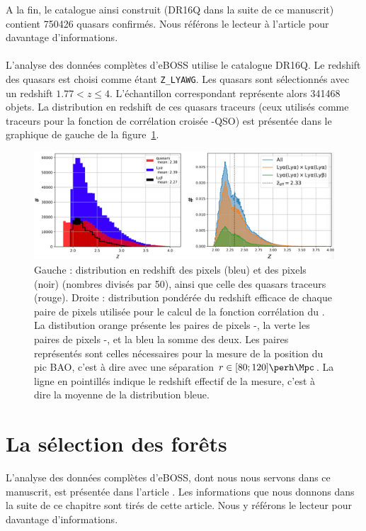 \documentclass[11pt, twoside, a4paper, openright]{report}
\begin{document}
A la fin, le catalogue ainsi construit (DR16Q dans la suite de ce manuscrit) contient \num{750426} quasars confirmés. Nous référons le lecteur à l'article \citet{CITE:Lyke in prep} pour davantage d'informations.



\paragraph{}
L'analyse \lya{} des données complètes d'eBOSS \citep{CITE:dr16} utilise le catalogue DR16Q. Le redshift des quasars est choisi comme étant \texttt{Z\_LYAWG}. Les quasars sont sélectionnés avec un redshift $1.77 < z \leq 4$. L'échantillon correspondant représente alors \num{341468} objets. La distribution en redshift de ces quasars traceurs (ceux utilisés comme traceurs pour la fonction de corrélation croisée \lya{}-QSO) est présentée dans le graphique de gauche de la figure~\ref{fig:pixel_number}.
\begin{figure}
  \centering
  \includegraphics[scale=0.4]{pixel_number}
  \caption{Gauche : distribution en redshift des pixels \lyalya{} (bleu) et des pixels\lyalyb{} (noir) (nombres divisés par 50), ainsi que celle des quasars traceurs (rouge). Droite : distribution pondérée du redshift efficace de chaque paire de pixels utilisée pour le calcul de la fonction corrélation du \lya{}. La distibution orange présente les paires de pixels \lyalya{}-\lyalya{}, la verte les paires de pixels \lyalya{}-\lyalyb{}, et la bleu la somme des deux. Les paires représentés sont celles nécessaires pour la mesure de la position du pic BAO, c'est à dire avec une séparation $r \in [\num{80} ; \num{120}] \si{\perh\Mpc}$. La ligne en pointillés indique le redshift effectif de la mesure, c'est à dire la moyenne de la distribution bleue.}
  \label{fig:pixel_number}
\end{figure}


\section{La sélection des forêts}
L'analyse \lya{} des données complètes d'eBOSS, dont nous nous servons dans ce manuscrit, est présentée dans l'article \citet{CITE:dr16}. Les informations que nous donnons dans la suite de ce chapitre sont tirés de cette article. Nous y référons le lecteur pour davantage d'informations.
\end{document}
